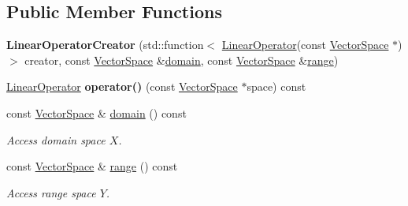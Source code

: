 \subsection*{\-Public \-Member \-Functions}
\begin{DoxyCompactItemize}
\item 
\hypertarget{classSpacy_1_1Generic_1_1LinearOperatorCreator_a212da2dedb9a6b0e8f45b8625364d832}{{\bfseries \-Linear\-Operator\-Creator} (std\-::function$<$ \hyperlink{classSpacy_1_1LinearOperator}{\-Linear\-Operator}(const \hyperlink{classSpacy_1_1VectorSpace}{\-Vector\-Space} $\ast$)$>$ creator, const \hyperlink{classSpacy_1_1VectorSpace}{\-Vector\-Space} \&\hyperlink{classSpacy_1_1OperatorBase_a2588f9b3e0188820c4c494e63293dc6f}{domain}, const \hyperlink{classSpacy_1_1VectorSpace}{\-Vector\-Space} \&\hyperlink{classSpacy_1_1OperatorBase_ab19d3b7a6f290b1079248f1e567e53d6}{range})}\label{classSpacy_1_1Generic_1_1LinearOperatorCreator_a212da2dedb9a6b0e8f45b8625364d832}

\item 
\hypertarget{classSpacy_1_1Generic_1_1LinearOperatorCreator_a34e9eee442ba1bffeab9905266500bf6}{\hyperlink{classSpacy_1_1LinearOperator}{\-Linear\-Operator} {\bfseries operator()} (const \hyperlink{classSpacy_1_1VectorSpace}{\-Vector\-Space} $\ast$space) const }\label{classSpacy_1_1Generic_1_1LinearOperatorCreator_a34e9eee442ba1bffeab9905266500bf6}

\item 
\hypertarget{classSpacy_1_1OperatorBase_a2588f9b3e0188820c4c494e63293dc6f}{const \hyperlink{classSpacy_1_1VectorSpace}{\-Vector\-Space} \& \hyperlink{classSpacy_1_1OperatorBase_a2588f9b3e0188820c4c494e63293dc6f}{domain} () const }\label{classSpacy_1_1OperatorBase_a2588f9b3e0188820c4c494e63293dc6f}

\begin{DoxyCompactList}\small\item\em \-Access domain space $X$. \end{DoxyCompactList}\item 
\hypertarget{classSpacy_1_1OperatorBase_ab19d3b7a6f290b1079248f1e567e53d6}{const \hyperlink{classSpacy_1_1VectorSpace}{\-Vector\-Space} \& \hyperlink{classSpacy_1_1OperatorBase_ab19d3b7a6f290b1079248f1e567e53d6}{range} () const }\label{classSpacy_1_1OperatorBase_ab19d3b7a6f290b1079248f1e567e53d6}

\begin{DoxyCompactList}\small\item\em \-Access range space $Y$. \end{DoxyCompactList}\end{DoxyCompactItemize}
